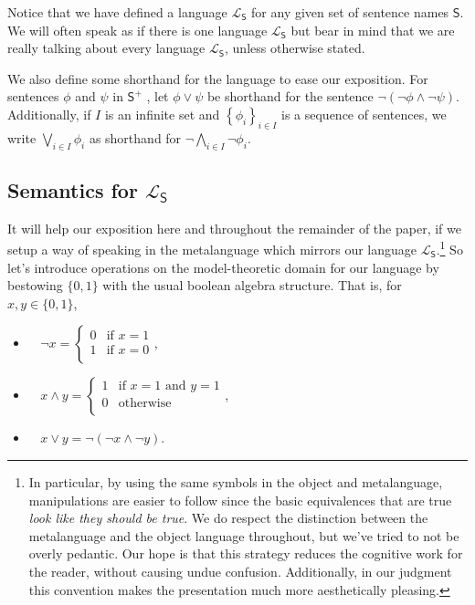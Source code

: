 \documentclass[12pt]{kluwer}
\theoremstyle{remark}
\newcommand{\prg}{\hspace{0.25in}}
\newcommand{\fancy}[1]{\mathcal{#1}}
\def\S{\textsf{S}}
\def\L{\fancy{L}}
\newcommand{\set}[1]{\left\{ #1 \right\}}
\begin{document}
Notice that we have defined a language $\L_\S$ for any given set of sentence names $\S$. We will often speak as if there is one language $\L_\S$ but bear in mind that we are really talking about every language $\L_\S$, unless otherwise stated.

\prg We also define some shorthand for the language to ease our exposition.  For sentences $\phi$ and $\psi$ in $\S^{+}$ , let $\phi \vee \psi$ be shorthand for the sentence $\neg (\neg \phi \wedge \neg \psi)$.  Additionally, if $I$ is an infinite set and $\set{\phi_i}_{i \in I}$ is a sequence of sentences, we write $\bigvee_{i \in I} \phi_i$ as shorthand for $\neg\bigwedge_{i \in I} \neg\phi_i$.

\subsection{Semantics for $\L_\S$}

It will help our exposition here and throughout the remainder of the paper, if we setup a way of speaking in the metalanguage which mirrors our language $\L_\S$.\footnote{In particular, by using the same symbols in the object and metalanguage, manipulations are easier to follow since the basic equivalences that are true \emph{look like they should be true}. We do respect the distinction between the metalanguage and the object language throughout, but we've tried to not be overly pedantic. Our hope is that this strategy reduces the cognitive work for the reader, without causing undue confusion. Additionally, in our judgment this convention makes the presentation much more aesthetically pleasing.} So let's introduce operations on the model-theoretic domain for our language by bestowing $\{0, 1\}$ with the usual boolean algebra structure. That is, for $x, y \in \{0, 1\}$, 
\begin{itemize}
\item $\;\;$ $\neg x = \begin{cases}
0 & \text{if } x = 1 \\
1 & \text{if } x = 0 \\
\end{cases}$,
\item $\;\;$ $x \wedge y = \begin{cases}
1 & \text{if } x = 1 \text{ and } y = 1 \\
0 & \text{otherwise} \\
\end{cases}$,
\item $\;\;$ $x \vee y = \neg (\neg x \wedge \neg y)$.\\
\end{itemize}
\end{document}
